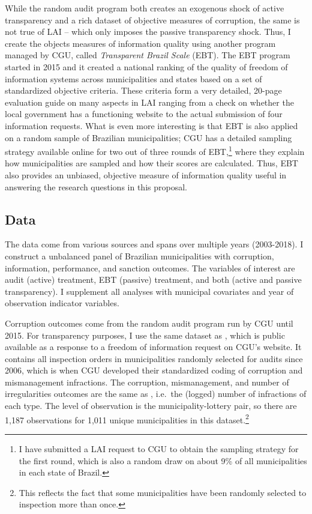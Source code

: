 \documentclass[11pt]{article}
\begin{document}
While the random audit program both creates an exogenous shock of active transparency and a rich dataset of objective measures of corruption, the same is not true of LAI -- which only imposes the passive transparency shock. Thus, I create the objects measures of information quality using another program managed by CGU, called \emph{Transparent Brazil Scale} (EBT). The EBT program started in 2015 and it created a national ranking of the quality of freedom of information systems across municipalities and states based on a set of standardized objective criteria. These criteria form a very detailed, 20-page evaluation guide on many aspects in LAI ranging from a check on whether the local government has a functioning website to the actual submission of four information requests. What is even more interesting is that EBT is also applied on a random sample of Brazilian municipalities; CGU has a detailed sampling strategy available online for two out of three rounds of EBT,\footnote{I have submitted a LAI request to CGU to obtain the sampling strategy for the first round, which is also a random draw on about 9\% of all municipalities in each state of Brazil.} where they explain how municipalities are sampled and how their scores are calculated. Thus, EBT also provides an unbiased, objective measure of information quality useful in answering the research questions in this proposal.

\subsection{Data} \label{subsec:data_paper3}

The data come from various sources and spans over multiple years (2003-2018). I construct a unbalanced panel of Brazilian municipalities with corruption, information, performance, and sanction outcomes. The variables of interest are audit (active) treatment, EBT (passive) treatment, and both (active and passive transparency). I supplement all analyses with municipal covariates and year of observation indicator variables.

Corruption outcomes come from the random audit program run by CGU until 2015. For transparency purposes, I use the same dataset as \citet{FinanGovernmentAuditsReduce2018}, which is public available as a response to a freedom of information request on CGU's website. It contains all inspection orders in municipalities randomly selected for audits since 2006, which is when CGU developed their standardized coding of corruption and mismanagement infractions. The corruption, mismanagement, and number of irregularities outcomes are the same as \citet{FinanGovernmentAuditsReduce2018}, i.e.~the (logged) number of infractions of each type. The level of observation is the municipality-lottery pair, so there are 1,187 observations for 1,011 unique municipalities in this dataset.\footnote{This reflects the fact that some municipalities have been randomly selected to inspection more than once.}
\end{document}
